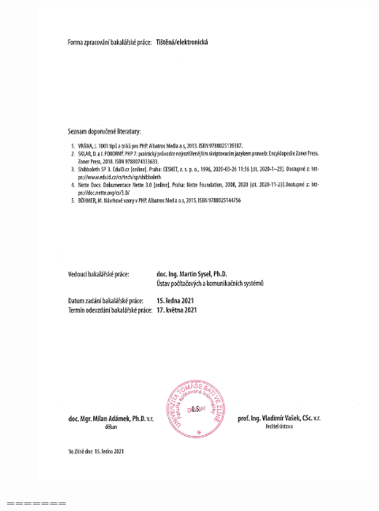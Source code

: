 {\begin{figure}[ht]
\begin{adjustwidth}{-2cm}{-2cm}
\centering
	\includegraphics[scale=0.9]{graphics/zadani_B.png}
\end{adjustwidth}\end{figure}
\clearpage
\voffset=\evensidemargin=\oddsidemargin=\headsep=\headheight=\setlength{\parskip}{3pt}\textheight=\textwidth=\topmargin=0.61cm
}

